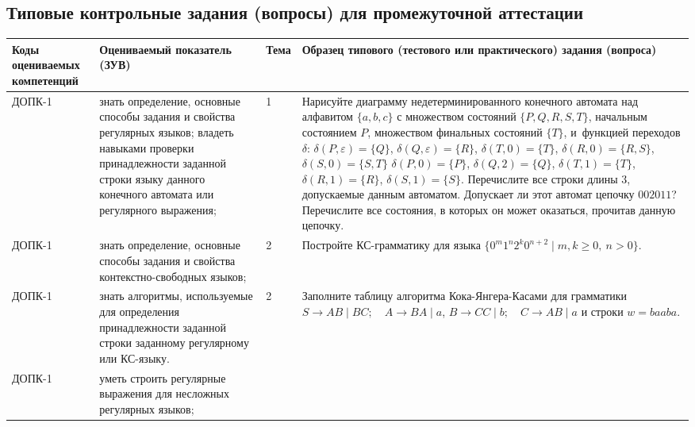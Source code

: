 \documentclass[a4paper,12pt]{article}
\begin{document}
\subsection{Типовые контрольные задания (вопросы) для промежуточной аттестации}

\begin{longtable}{|p{15mm}|p{42mm}|p{17mm}|p{70mm}|}
\hline
\centering\small Коды оцениваемых компетенций  & \centering Оцениваемый показатель (ЗУВ) 
& \centering Тема  & \centering\arraybackslash Образец типового (тестового или практического) задания (вопроса)
\\
\hline

ДОПК-1 & 
знать определение, основные способы задания и свойства регулярных языков;
владеть навыками проверки принадлежности заданной строки языку данного конечного автомата или регулярного выражения; & 
1 & 
Нарисуйте диаграмму недетерминированного конечного автомата над алфавитом $\{a,b,c\}$
с множеством состояний $\{P, Q, R, S, T\}$, начальным состоянием $P$,
множеством финальных состояний $\{T\}$, и~функцией переходов $\delta$:\newline
{\small
$\delta(P,ε)=\{Q\}$,  $\delta(Q,ε)=\{R\}$,  $\delta(T,0)=\{T\}$,\newline
$\delta(R,0)=\{R,S\}$, $\delta(S,0)=\{S,T\}$\newline
$\delta(P,0)=\{P\}$,  $\delta(Q,2)=\{Q\}$, \newline
$\delta(T,1)=\{T\}$, $\delta(R,1)=\{R\}$,   $\delta(S,1)=\{S\}$.\newline
}
Перечислите все строки длины $3$, допускаемые данным автоматом.
Допускает ли этот автомат цепочку $002011$? Перечислите все состояния, в которых он может оказаться, прочитав данную цепочку. 
\\
\hline
ДОПК-1 & 
знать определение, основные способы задания и свойства контекстно-свободных языков; & 
2 & 
Постройте КС-грамматику для языка $\{0^m 1^n 2^k 0^{n+2} \mid m,k \geqslant 0,\: n>0\}$. 
\\
\hline
ДОПК-1 & 
знать алгоритмы, используемые для определения принадлежности заданной строки заданному регулярному или КС-языку. & 
2 & 
Заполните таблицу алгоритма Кока-Янгера-Касами для грамматики \newline
$S \to AB \mid BC;\quad A \to BA \mid a$,\newline
$B \to CC \mid b;\quad C \to AB \mid a$\newline
и строки $w = baaba$. 
\\
\hline
ДОПК-1 & 
уметь строить регулярные выражения для несложных регулярных языков; & 

\end{longtable}
\end{document}
